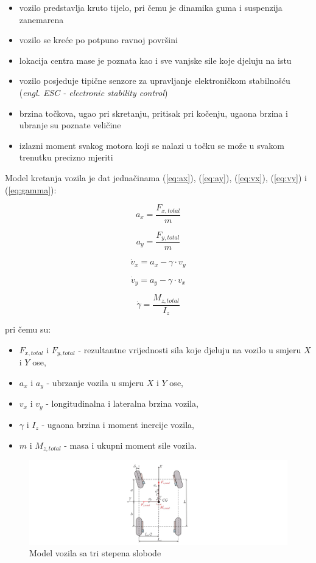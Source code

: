 \begin{itemize}
	\item vozilo predstavlja kruto tijelo, pri čemu je dinamika guma i suspenzija zanemarena
	\item vozilo se kreće po potpuno ravnoj površini
	\item lokacija centra mase je poznata kao i sve vanjske sile koje djeluju na istu
	\item vozilo posjeduje tipične senzore za upravljanje elektroničkom stabilnošću (\textit{engl. ESC - electronic stability control})
	\item brzina točkova, ugao pri skretanju, pritisak pri kočenju, ugaona brzina i ubranje su poznate veličine
	\item izlazni moment svakog motora koji se nalazi u točku se može u svakom trenutku precizno mjeriti
\end{itemize}

Model kretanja vozila je dat jednačinama (\ref{eq:ax}), (\ref{eq:ay}), (\ref{eq:vx}), (\ref{eq:vy}) i (\ref{eq:gamma}):

\begin{equation}\label{eq:ax}
a_x = \frac{F_{x,total}}{m}
\end{equation}

\begin{equation}\label{eq:ay}
a_y = \frac{F_{y,total}}{m}
\end{equation}

\begin{equation}\label{eq:vx}
\dot{v}_x = a_x - \gamma \cdot v_y
\end{equation}

\begin{equation}\label{eq:vy}
\dot{v}_y = a_y - \gamma \cdot v_x
\end{equation}

\begin{equation}\label{eq:gamma}
\dot{\gamma} = \frac{M_{z,total}}{I_z}
\end{equation}

pri čemu su:

\begin{itemize}
	\item $F_{x,total}$ i $F_{y,total}$ - rezultantne vrijednosti sila koje djeluju na vozilo u smjeru $X$ i $Y$ ose,
	\item $a_x$ i $a_y$ - ubrzanje vozila u smjeru $X$ i $Y$ ose,
	\item $v_x$ i $v_y$ - longitudinalna i lateralna brzina vozila,
	\item $\gamma$ i $I_z$ - ugaona brzina i moment inercije vozila,
	\item $m$ i $M_{z,total}$ - masa i ukupni moment sile vozila.
\end{itemize}

\begin{figure}
\centering
\includegraphics[width=\textwidth]{slike/3dof.jpg}
\caption{Model vozila sa tri stepena slobode \cite{zhu2019braking}}
\label{fig:3dof}
\end{figure}


